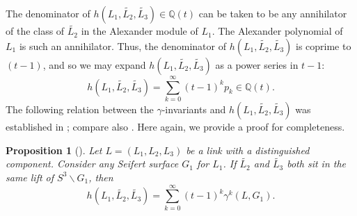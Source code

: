\documentclass[a4paper, 11pt]{amsart}
\newtheorem{proposition}[theorem]{Proposition}
\theoremstyle{definition}
\newcommand{\Q}{\mathbb{Q}}
\newcommand{\noteta}{h}
\begin{document}


The denominator of $h(L_1,\widetilde{L_2},\widetilde{L_3})\in \Q(t)$ can be taken to be any annihilator of the class of $\widetilde{L_2}$ in the Alexander module of $L_1$. The Alexander polynomial of $L_1$ is such an annihilator. Thus, the denominator of $h(L_1,\widetilde{L_2},\widetilde{L_3})$ is coprime to $(t-1)$, and so we may expand $h(L_1,\widetilde{L_2},\widetilde{L_3})$ as a power series in $t-1$:
$$
h(L_1,\widetilde{L_2},\widetilde{L_3})=\sum_{k=0}^\infty (t-1)^k p_k\in \Q(t).
$$
{The following relation between the $\gamma$-invariants and
$h(L_1,\widetilde{L_2},\widetilde{L_3})$ was established in
\cite[Theorem~1.4]{Tsukamoto-Yasuhara:2007}; compare also
\cite[Theorem~7.1]{C3}. Here again, we provide a proof for completeness.}



\begin{proposition}[{\cite[Theorem~1.4]{Tsukamoto-Yasuhara:2007}}]\label{thm: h is gamma}
Let $L=(L_1,L_2,L_3)$ be a link with  a distinguished component. Consider any Seifert surface $G_1$ for $L_1$.
If $\widetilde{L_2}$ and $\widetilde{L_3}$ both sit in the same lift of $S^3\smallsetminus G_1$, then
$$
\noteta(L_1, \widetilde{L_2},\widetilde{L_3})= \sum_{k=0}^\infty (t-1)^k \gamma^k(L,G_1).
$$
\end{proposition}
\end{document}
